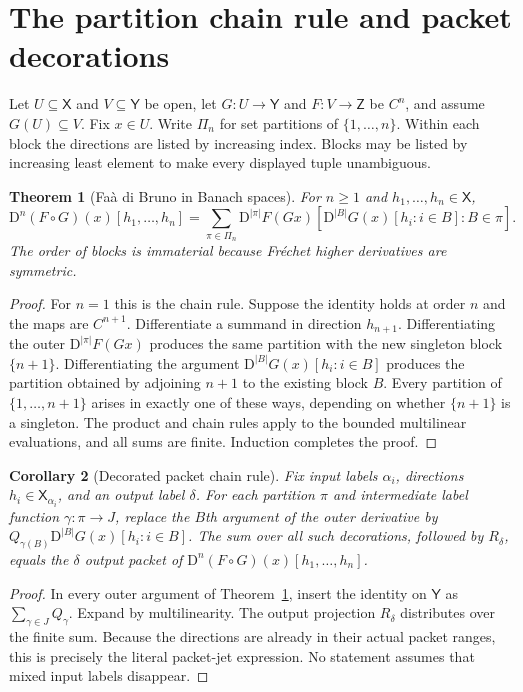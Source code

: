 \documentclass[11pt]{article}
\newtheorem{theorem}{Theorem}[section]
\newtheorem{corollary}[theorem]{Corollary}
\theoremstyle{remark}\newtheorem{remark}[theorem]{Remark}
\newcommand{\X}{\mathsf X}\newcommand{\Y}{\mathsf Y}\newcommand{\Z}{\mathsf Z}
\newcommand{\D}{\mathrm D}
\begin{document}
\section{The partition chain rule and packet decorations}
Let $U\subseteq\X$ and $V\subseteq\Y$ be open, let $G:U\to\Y$ and $F:V\to\Z$ be $C^n$, and assume $G(U)\subseteq V$. Fix $x\in U$. Write $\Pi_n$ for set partitions of $\{1,\ldots,n\}$. Within each block the directions are listed by increasing index. Blocks may be listed by increasing least element to make every displayed tuple unambiguous.
\begin{theorem}[Fa\`a di Bruno in Banach spaces]\label{thm:faa}
For $n\ge1$ and $h_1,\ldots,h_n\in\X$,
\[
\D^n(F\circ G)(x)[h_1,\ldots,h_n]
=\sum_{\pi\in\Pi_n}\D^{|\pi|}F(Gx)
\left[\D^{|B|}G(x)[h_i:i\in B]:B\in\pi\right].
\]
The order of blocks is immaterial because Fr\'echet higher derivatives are symmetric.
\end{theorem}
\begin{proof}
For $n=1$ this is the chain rule. Suppose the identity holds at order $n$ and the maps are $C^{n+1}$. Differentiate a summand in direction $h_{n+1}$. Differentiating the outer $\D^{|\pi|}F(Gx)$ produces the same partition with the new singleton block $\{n+1\}$. Differentiating the argument $\D^{|B|}G(x)[h_i:i\in B]$ produces the partition obtained by adjoining $n+1$ to the existing block $B$. Every partition of $\{1,\ldots,n+1\}$ arises in exactly one of these ways, depending on whether $\{n+1\}$ is a singleton. The product and chain rules apply to the bounded multilinear evaluations, and all sums are finite. Induction completes the proof.
\end{proof}

\begin{corollary}[Decorated packet chain rule]\label{cor:decorated}
Fix input labels $\alpha_i$, directions $h_i\in\X_{\alpha_i}$, and an output label $\delta$. For each partition $\pi$ and intermediate label function $\gamma:\pi\to J$, replace the $B$th argument of the outer derivative by $Q_{\gamma(B)}\D^{|B|}G(x)[h_i:i\in B]$. The sum over all such decorations, followed by $R_\delta$, equals the $\delta$ output packet of $\D^n(F\circ G)(x)[h_1,\ldots,h_n]$.
\end{corollary}
\begin{proof}
In every outer argument of Theorem~\ref{thm:faa}, insert the identity on $\Y$ as $\sum_{\gamma\in J}Q_\gamma$. Expand by multilinearity. The output projection $R_\delta$ distributes over the finite sum. Because the directions are already in their actual packet ranges, this is precisely the literal packet-jet expression. No statement assumes that mixed input labels disappear.
\end{proof}
\end{document}
